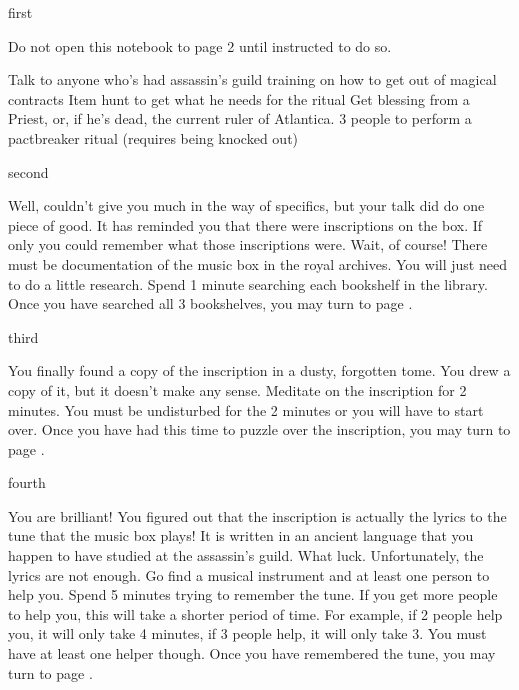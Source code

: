 \documentclass[greennotebook]{NeptuneBall}
\begin{document}

\startnotebook{\nSpellBreakNotebook}

\begin{page}{first}

Do not open this notebook to page 2 until instructed to do so.

Talk to anyone who's had assassin's guild training on how to get out of magical contracts
Item hunt to get what he needs for the ritual
Get blessing from a Priest, or, if he's dead, the current ruler of Atlantica.
3 people to perform a pactbreaker ritual (requires being knocked out)

\end{page}

\begin{page}{second}

Well, \cManta{} couldn't give you much in the way of specifics, but your talk did do one piece of good. It has reminded you that there were inscriptions on the box. If only you could remember what those inscriptions were. Wait, of course! There must be documentation of the music box in the royal archives. You will just need to do a little research. Spend 1 minute searching each bookshelf in the library. Once you have searched all 3 bookshelves, you may turn to page .

\end{page}

\begin{page}{third}

You finally found a copy of the inscription in a dusty, forgotten tome. You drew a copy of it, but it doesn't make any sense. Meditate on the inscription for 2 minutes. You must be undisturbed for the 2 minutes or you will have to start over. Once you have had this time to puzzle over the inscription, you may turn to page .

\end{page}

\begin{page}{fourth}

You are brilliant! You figured out that the inscription is actually the lyrics to the tune that the music box plays! It is written in an ancient language that you happen to have studied at the assassin's guild. What luck. Unfortunately, the lyrics are not enough. Go find a musical instrument and at least one person to help you. Spend 5 minutes trying to remember the tune. If you get more people to help you, this will take a shorter period of time. For example, if 2 people help you, it will only take 4 minutes, if 3 people help, it will only take 3. You must have at least one helper though. Once you have remembered the tune, you may turn to page .

\end{page}
\end{document}
